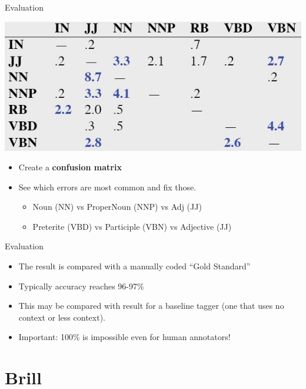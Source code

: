 \documentclass[9pt,xcolor=pdftex,dvipsnames,table]{beamer}
\begin{document}
\begin{frame}{Evaluation}

	\includegraphics[width=.8\paperwidth]{hmm-confusion}\\
	\vspace{.5cm}
	\begin{itemize}
		\item Create a \textbf{confusion matrix}
		\item See which errors are most common and fix those.
		
		\begin{itemize}
			\item Noun (NN) vs ProperNoun (NNP) vs Adj (JJ)
			\item Preterite (VBD) vs Participle (VBN) vs Adjective (JJ)
		\end{itemize}
	\end{itemize}
\end{frame}

\begin{frame}{Evaluation}
	\begin{itemize}
		\item The result is compared with a manually coded ``Gold Standard''
		\item Typically accuracy reaches 96-97\%
		\item This may be compared with result for a baseline tagger (one that uses no context or less context).
		\item Important: 100\% is impossible even for human annotators!
	\end{itemize}
\end{frame}

\section{Brill}
\end{document}
